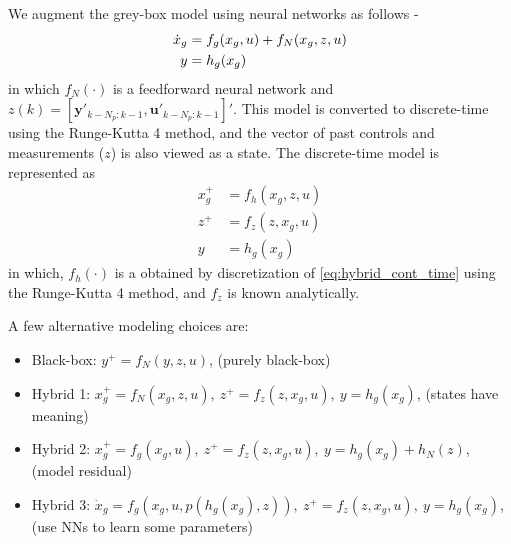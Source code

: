 \documentclass{article}
\begin{document}
We augment the grey-box model using
neural networks as follows -
\begin{align} \label{eq:hybrid_cont_time}
\dot x_g &= f_g(x_g, u) + 
f_N(x_g, z, u) \notag \\
y &= h_g(x_g) 
\end{align}
in which $f_N(\cdot)$ is a feedforward neural network
and $z(k) = [\mathbf{y}'_{k-N_p:k-1}, \mathbf{u}'_{k-N_p:k-1}]'$.
This model is converted to discrete-time using the 
Runge-Kutta 4 method, and the vector of past controls
and measurements ($z$) is also viewed as a state. The discrete-time 
model is represented as 
\begin{align*}
  x_g^+ &= f_h(x_g, z, u) \\
  z^+ &= f_z(z, x_g, u)\\
  y &= h_g(x_g) 
\end{align*}
in which, $f_h(\cdot)$ is a obtained by discretization
of \eqref{eq:hybrid_cont_time} using the Runge-Kutta 4 method, 
and $f_z$ is known analytically.

A few alternative modeling choices are:
\begin{itemize}
	\item Black-box: $y^+ = f_N(y, z, u)$, (purely black-box)
  \item Hybrid 1: $x_g^+ = f_N(x_g, z, u), 
                   \ z^+ = f_z(z, x_g, u), \ y = h_g(x_g)$, 
  (states have meaning)
  \item Hybrid 2: $x_g^+ = f_g(x_g, u), 
                   \ z^+ = f_z(z, x_g, u), \ y = h_g(x_g) + h_N(z)$, 
	(model residual)
  \item Hybrid 3: $\dot x_g = f_g(x_g, u, p(h_g(x_g), z)),
  \ z^+ = f_z(z, x_g, u), \ y = h_g(x_g)$, (use NNs to learn some parameters)
\end{itemize}

\end{document}
